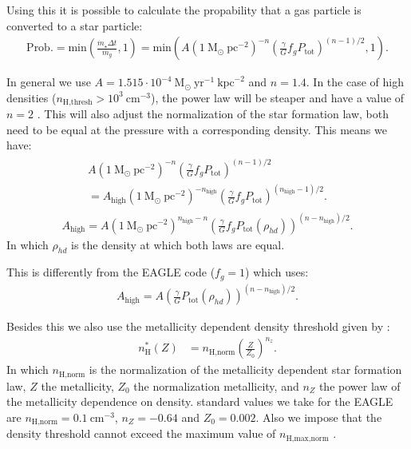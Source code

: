 \noindent Using this it is possible to calculate the propability that a gas particle is 
converted to a star particle:
\begin{align}
 \text{Prob.} = \text{min} \left( \frac{\dot{m}_\star \Delta t}{m_g}, 1 \right) 
 = \text{min} \left( A \left( 1 ~\text{M}_\odot ~\text{pc}^{-2} \right)^{-n} \left( \frac{\gamma}{G} f_g P_\text{tot} \right)^{(n-1)/2}, 1 \right).
\end{align}

\noindent In general we use $A=1.515 \cdot 10^{-4}~\text{M}_\odot ~\text{yr}^{-1} ~\text{kpc}^{-2}$ 
and $n=1.4$. In the case of high densities ($n_\text{H,thresh} > 10^3 ~\text{cm}^{-3}$),
the power law will be steaper and have a value of $n=2$ \citep{schaye2015}. This will also adjust
the normalization of the star formation law, both need to be equal at the 
pressure with a corresponding density. This means we have:
\begin{align}
\begin{split}
 A \left( 1 ~\text{M}_\odot ~\text{pc}^{-2} \right)^{-n} \left( \frac{\gamma}{G} f_g P_\text{tot} \right)^{(n-1)/2} \\
 = A_\text{high} \left( 1 ~\text{M}_\odot ~\text{pc}^{-2} \right)^{-n_\text{high}} \left( \frac{\gamma}{G} f_g P_\text{tot} \right)^{(n_\text{high}-1)/2}. 
\end{split}
\end{align}
\begin{align}
A_\text{high} = A \left( 1 ~\text{M}_\odot ~\text{pc}^{-2} \right)^{n_\text{high}-n} \left( \frac{\gamma}{G} f_g P_\text{tot}(\rho_{hd}) \right)^{(n-n_\text{high})/2}. 
\end{align}
In which $\rho_{hd}$ is the density at which both laws are equal.

This is differently from the EAGLE code ($f_g=1$) which uses:
\begin{align}
A_\text{high} = A \left( \frac{\gamma}{G} P_\text{tot} (\rho_{hd}) \right)^{(n-n_\text{high})/2} . 
\end{align}

Besides this we also use the metallicity dependent density threshold given by \citep{schaye2004}:
\begin{align}
n^*_\text{H} (Z) &= n_\text{H,norm} \left( \frac{Z}{Z_0} \right)^{n_z}.
\end{align}
In which $n_\text{H,norm}$ is the normalization of the metallicity dependent 
star formation law, $Z$ the metallicity, $Z_0$ the normalization metallicity,
and $n_Z$ the power law of the metallicity dependence on density. standard 
values we take for the EAGLE are $n_\text{H,norm} = 0.1 ~\text{cm}^{-3}$, 
$n_Z=-0.64$ and $Z_0 = 0.002$. Also we impose that the density threshold cannot
exceed the maximum value of $n_\text{H,max,norm}$ \citep{schaye2015}.

